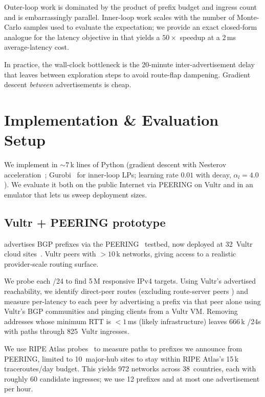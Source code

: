 \documentclass[acmsmall,anonymous,review,nonacm,10pt]{acmart}
\begin{document}
  Outer-loop work is dominated by the product of
prefix budget and ingress count and is embarrassingly parallel.
Inner-loop work scales with the number of Monte-Carlo samples used
to evaluate the expectation; we provide an exact closed-form
analogue for the latency objective in  that
yields a $50\times$ speedup at a $2$\,ms average-latency cost.

  In practice, the wall-clock bottleneck is the
20-minute inter-advertisement delay that \sparse leaves between
exploration steps to avoid route-flap dampening.  Gradient descent
\emph{between} advertisements is cheap.

\section{Implementation \& Evaluation Setup}
\label{sec:implementation}

We implement \sparse in ${\sim}7$\,k lines of Python (gradient
descent with Nesterov acceleration~\cite{nesterov2018lectures};
Gurobi~\cite{gurobi} for inner-loop LPs; learning rate $0.01$ with
decay, $\alpha_l=4.0$).  We evaluate it both on the public
Internet via PEERING on Vultr and in an emulator that lets us
sweep deployment sizes.

\subsection{Vultr + PEERING prototype}

\sparse advertises BGP prefixes via the
PEERING~\cite{schlinker19peering} testbed, now deployed at
32~Vultr cloud sites~\cite{vultr}.  Vultr peers with
${>}10$\,k networks, giving \sparse access to a realistic
provider-scale routing surface.

  We probe each /24 to find 5\,M
responsive IPv4 targets.  Using Vultr's advertised reachability,
we identify direct-peer routes (excluding route-server peers
\cite{chatzis2013there}) and measure per-\ug latency to each
peer by advertising a prefix via that peer alone using Vultr's
BGP communities and pinging clients from a Vultr VM.  Removing
addresses whose minimum RTT is ${<}1$\,ms (likely infrastructure)
leaves 666\,k /24s with paths through 825~Vultr ingresses.

  We use RIPE Atlas
probes~\cite{ripe-atlas} to measure paths to prefixes we announce
from PEERING, limited to 10~major-hub sites to stay within RIPE
Atlas's 15\,k traceroutes/day budget.  This yields 972 networks
across 38~countries, each with roughly 60 candidate ingresses; we
use 12 prefixes and at most one advertisement per hour.
\end{document}
